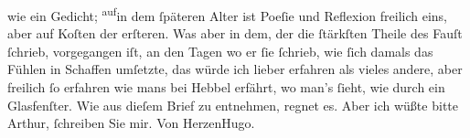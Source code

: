 \begin{ledgroupsized}[t]{13cm}
               wie ein Gedicht; \substVorne{}\textsuperscript{auf}\substDazwischen{}in\substHinten{} dem ſpäteren Alter ist Poeſie und Reflexion freilich eins, aber auf Koſten
               der erſteren. Was aber in dem, der die ſtärkſten Theile des Fauſt ſchrieb, vorgegangen iſt, an den Tagen wo er ſie ſchrieb,
               wie ſich damals das Fühlen in Schaffen umſetzte, das würde ich lieber erfahren als
               vieles andere, aber freilich ſo erfahren wie mans bei Hebbel erfährt, wo man’s ſieht, wie durch ein Glasfenſter.\pend
           \pstart
           Wie aus dieſem Brief zu entnehmen, regnet es. Aber ich wüßte \label{T_L01297-1v}\label{T_L01297-1h} bitte
               Arthur, ſchreiben Sie mir.\pend
           \pstart Von Herzen\spacefill\mbox{Hugo.}\pend{}
         
         \endnumbering{}\end{ledgroupsized}  \newcommand{\dateiname}{L01297}\newcommand{\titel}{Hugo von Hofmannsthal an Arthur Schnitzler, 19. 6. [1903]}\newcommand{\editorInnen}{Martin Anton Müller und Gerd-Hermann Susen}
      